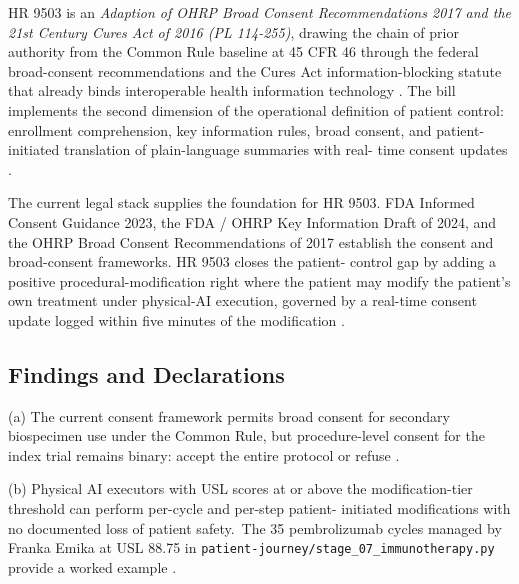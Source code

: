 
\hspace{0.5cm} HR 9503 is an \textit{Adaption of OHRP Broad Consent Recommendations
2017 and the 21st Century Cures Act of 2016 (PL 114-255)}, drawing
the chain of prior authority from the Common Rule baseline at 45
CFR 46 through the federal broad-consent recommendations and the
Cures Act information-blocking statute that already binds
interoperable health information technology
\cite{ohrp_broad_consent_attachment_c_2017, rank1_cures_act_2016,
hhs_45cfr46_protection_human_subjects}. The bill implements the
second dimension of the operational definition of patient control:
enrollment comprehension, key information rules, broad consent, and
patient-initiated translation of plain-language summaries with real-
time consent updates \cite{fda_informed_consent_guidance_2023,
fda_ohrp_key_information_draft_2024}.

The current legal stack supplies the foundation for HR 9503. FDA
Informed Consent Guidance 2023, the FDA / OHRP Key Information Draft
of 2024, and the OHRP Broad Consent Recommendations of 2017 establish
the consent and broad-consent frameworks. HR 9503 closes the patient-
control gap by adding a positive procedural-modification right where
the patient may modify the patient's own treatment under physical-AI
execution, governed by a real-time consent update logged within
five minutes of the modification \cite{fda_informed_consent_guidance_2023,
fda_ohrp_key_information_draft_2024,
ohrp_broad_consent_attachment_c_2017}.

\subsection{Findings and Declarations}

\hspace{0.5cm} (a) The current consent framework permits broad consent for secondary
biospecimen use under the Common Rule, but procedure-level consent
for the index trial remains binary: accept the entire protocol or
refuse \cite{hhs_45cfr46_protection_human_subjects,
ohrp_broad_consent_attachment_c_2017}.

(b) Physical AI executors with USL scores at or above the
modification-tier threshold can perform per-cycle and per-step patient-
initiated modifications with no documented loss of patient safety.\ The 35
pembrolizumab cycles managed by Franka Emika at USL 88.75 in
\texttt{patient-journey/stage\_07\_immunotherapy.py} provide a worked
example \cite{kawchak_2026_19119939, kawchak_2026_18778219}.

